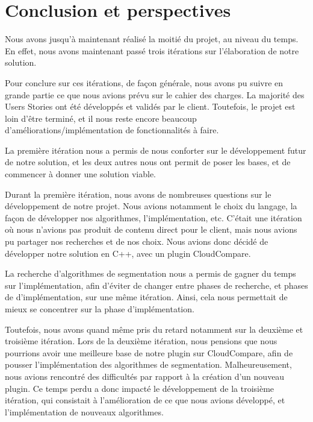 \documentclass[12pt,titlepage,french]{article}
\begin{document}
\newpage
\section{Conclusion et perspectives}

Nous avons jusqu'à maintenant réalisé la moitié du projet, au niveau du temps. En effet, nous avons maintenant passé trois itérations sur l'élaboration de notre solution. \newline

Pour conclure sur ces itérations, de façon générale, nous avons pu suivre en grande partie ce que nous avions prévu sur le cahier des charges. La majorité des Users Stories ont été développés et validés par le client. Toutefois, le projet est loin d'être terminé, et il nous reste encore beaucoup d'améliorations/implémentation de fonctionnalités à faire.

La première itération nous a permis de nous conforter sur le développement futur de notre solution, et les deux autres nous ont permit de poser les bases, et de commencer à donner une solution viable.

Durant la première itération, nous avons de nombreuses questions sur le développement de notre projet. Nous avions notamment le choix du langage, la façon de développer nos algorithmes, l'implémentation, etc. C'était une itération où nous n'avions pas produit de contenu direct pour le client, mais nous avions pu partager nos recherches et de nos choix. Nous avions donc décidé de développer notre solution en C++, avec un plugin CloudCompare.

La recherche d'algorithmes de segmentation nous a permis de gagner du temps sur l'implémentation, afin d'éviter de changer entre phases de recherche, et phases de d'implémentation, sur une même itération. Ainsi, cela nous permettait de mieux se concentrer sur la phase d'implémentation.

Toutefois, nous avons quand même pris du retard notamment sur la deuxième et troisième itération. Lors de la deuxième itération, nous pensions que nous pourrions avoir une meilleure base de notre plugin sur CloudCompare, afin de pousser l'implémentation des algorithmes de segmentation. Malheureusement, nous avions rencontré des difficultés par rapport à la création d'un nouveau plugin. Ce temps perdu a donc impacté le développement de la troisième itération, qui consistait à l'amélioration de ce que nous avions développé, et l'implémentation de nouveaux algorithmes.
\end{document}
